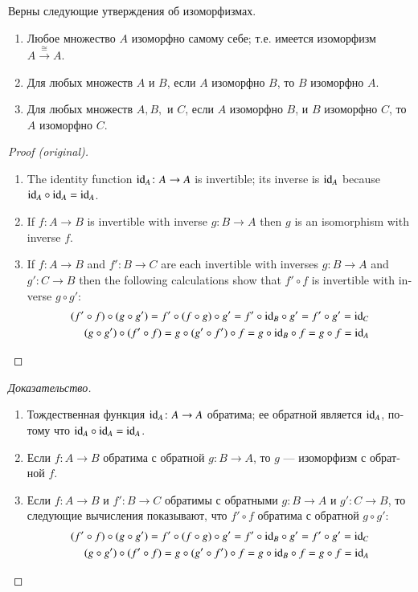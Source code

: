 \documentclass[a4paper]{book}
\def\tn{\textnormal}
\def\to{\rightarrow}
\def\taking{\colon}
\def\iso{\cong}
\newcommand{\To}[1]{\xrightarrow{#1}}
\def\id{\tn{id}}
\theoremstyle{myth}
\newenvironment{proofENG}{\begin{proof}[Proof (original)]}{\end{proof}}
\newtheorem{lemmaRUS}[envRUS]{\begin{russian}Лемма\end{russian}}
\newenvironment{proofRUS}{\begin{proof}[Доказательство]}{\end{proof}}
\begin{document}
\begin{english}
\begin{lemmaRUS}\label{lemma:isomorphic ER in Set}
\begin{russian}
Верны следующие утверждения об изоморфизмах.
\begin{enumerate}
\item Любое множество $A$ изоморфно самому себе; т.е. имеется изоморфизм $A\To{\iso} A$.
\item Для любых множеств $A$ и $B$, если $A$ изоморфно $B$, то $B$ изоморфно $A$.
\item Для любых множеств $A, B,$ и $C$, если $A$ изоморфно $B$, и $B$ изоморфно $C$, то $A$ изоморфно $C$.
\end{enumerate}
\end{russian}
\end{lemmaRUS}

\begin{proofENG}
\begin{enumerate}
\item The identity function $\id_A\taking A\to A$ is invertible; its inverse is $\id_A$ because $\id_A\circ\id_A=\id_A$.
\item If $f\taking A\to B$ is invertible with inverse $g\taking B\to A$ then $g$ is an isomorphism with inverse $f$.
\item If $f\taking A\to B$ and $f'\taking B\to C$ are each invertible with inverses $g\taking B\to A$ and $g'\taking C\to B$ then the following calculations show that $f'\circ f$ is invertible with inverse $g\circ g'$: 
\begin{align*}
(f'\circ f)\circ(g\circ g')=f'\circ(f\circ g)\circ g'=f'\circ\id_B\circ g'=f'\circ g'=\id_C\\
(g\circ g')\circ(f'\circ f)=g\circ(g'\circ f')\circ f=g\circ\id_B\circ f=g\circ f=\id_A
\end{align*}
\end{enumerate}
\end{proofENG}

\begin{proofRUS}
\begin{russian}
\begin{enumerate}
\item Тождественная функция $\id_A\taking A\to A$ обратима; ее обратной является $\id_A$, потому что $\id_A\circ\id_A=\id_A$.
\item Если $f\taking A\to B$ обратима с обратной $g\taking B\to A$, то $g$ — изоморфизм с обратной $f$.
\item Если $f\taking A\to B$ и $f'\taking B\to C$ обратимы с обратными $g\taking B\to A$ и $g'\taking C\to B$, то следующие вычисления показывают, что $f'\circ f$ обратима с обратной $g\circ g'$: 
\begin{align*}
(f'\circ f)\circ(g\circ g')=f'\circ(f\circ g)\circ g'=f'\circ\id_B\circ g'=f'\circ g'=\id_C\\
(g\circ g')\circ(f'\circ f)=g\circ(g'\circ f')\circ f=g\circ\id_B\circ f=g\circ f=\id_A
\end{align*}
\end{enumerate}
\end{russian}
\end{proofRUS}


\end{english}
\end{document}
